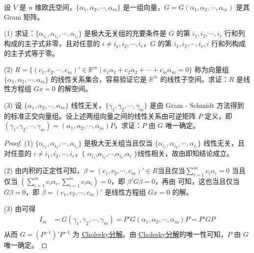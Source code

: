 \documentclass[../../main.tex]{subfiles}%
\begin{document}
\begin{proposition}\label{proposition:例9.36}
设 \(V\) 是 \(n\) 维欧氏空间，\(\{\alpha_1,\alpha_2,\cdots,\alpha_m\}\) 是一组向量，\(G = G(\alpha_1,\alpha_2,\cdots,\alpha_m)\) 是其 Gram 矩阵。

(1) 求证：\(\{\alpha_{i_1},\alpha_{i_2},\cdots,\alpha_{i_r}\}\) 是极大无关组的充要条件是 \(G\) 的第 \(i_1,i_2,\cdots,i_r\) 行和列构成的主子式非零，且对任意的 \(i\neq i_1,i_2,\cdots,i_r\)，\(G\) 的第 \(i_1,i_2,\cdots,i_r,i\) 行和列构成的主子式等于零。

(2) \(R = \{(c_1,c_2,\cdots,c_m)'\in\mathbb{R}^m\mid c_1\alpha_1 + c_2\alpha_2 + \cdots + c_m\alpha_m = 0\}\) 称为向量组 \(\{\alpha_1,\alpha_2,\cdots,\alpha_m\}\) 的线性关系集合，容易验证它是 \(\mathbb{R}^m\) 的线性子空间。求证：\(R\) 是线性方程组 \(Gx = 0\) 的解空间。

(3) 设 \(\{\alpha_1,\alpha_2,\cdots,\alpha_m\}\) 线性无关，\(\{\gamma_1,\gamma_2,\cdots,\gamma_m\}\) 是由 Gram - Schmidt 方法得到的标准正交向量组。设上述两组向量之间的线性关系由可逆矩阵 \(P\) 定义，即 \((\gamma_1,\gamma_2,\cdots,\gamma_m)=(\alpha_1,\alpha_2,\cdots,\alpha_m)P\)，求证：\(P\) 由 \(G\) 唯一确定。
\end{proposition}
\begin{proof}

(1) \(\{\alpha_{i_1},\alpha_{i_2},\cdots,\alpha_{i_r}\}\) 是极大无关组当且仅当 \(\{\alpha_{i_1},\alpha_{i_2},\cdots,\alpha_{i_r}\}\) 线性无关，且对任意的 $i\neq i_1,i_2,\cdots,i_r$，$\{$ $\alpha_{i_1}$,$\alpha_{i_2}$,$\cdots$,$\alpha_{i_r}$,$\alpha_i$ $\}$线性相关，故由即知结论成立。

(2) 由内积的正定性可知，\(\beta=(c_1,c_2,\cdots,c_m)'\in R\)当且仅当$\sum_{i = 1}^{m}c_i\alpha_i=0$ 当且仅当 \((\sum_{i = 1}^{m}c_i\alpha_i,\sum_{i = 1}^{m}c_i\alpha_i)=0\)，即 \(\beta'G\beta = 0\)，再由 可知，这也当且仅当 \(G\beta = 0\)，即 \(\beta=(c_1,c_2,\cdots,c_m)'\) 是线性方程组 \(Gx = 0\) 的解。 

(3) 由可得
\begin{align*}
I_m &= G(\gamma_1,\gamma_2,\cdots,\gamma_m)=P'G(\alpha_1,\alpha_2,\cdots,\alpha_m)P = P'GP\\
\end{align*}
从而 \(G=(P^{-1})'P^{-1}\) 为 \hyperref[proposition:正定阵的3个充要条件]{Cholesky分解}。由 \hyperref[proposition:正定阵的3个充要条件]{Cholesky分解}的唯一性可知，\(P\) 由 \(G\) 唯一确定。

\end{proof}
\end{document}
